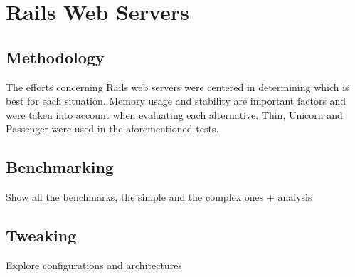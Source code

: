 \section{Rails Web Servers} %
\label{solution:sec:rails_web_servers}

\subsection{Methodology}
The efforts concerning Rails web servers were centered in determining which is best for each situation. Memory usage and stability are important factors and were taken into account when evaluating each alternative. Thin, Unicorn and Passenger were used in the aforementioned tests.




\subsection{Benchmarking}
Show all the benchmarks, the simple and the complex ones + analysis

\subsection{Tweaking}
Explore configurations and architectures

